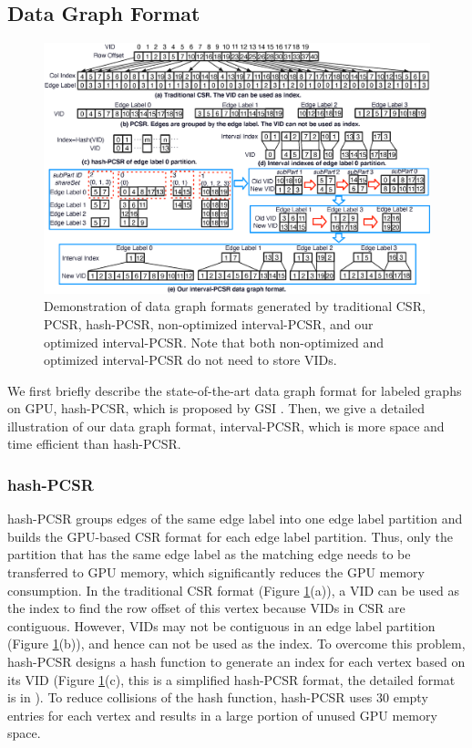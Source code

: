 \subsection{Data Graph Format}
\begin{figure}
\centering
\includegraphics[width=\textwidth]{./figure/graphformat.eps}
\caption{Demonstration of data graph formats generated by traditional CSR, PCSR, hash-PCSR, non-optimized interval-PCSR, and our optimized interval-PCSR. Note that both non-optimized and optimized interval-PCSR do not need to store VIDs.}	
\label{fig:dataformat}
\end{figure}

We first briefly describe the state-of-the-art data graph format for labeled graphs on GPU, hash-PCSR, which is proposed by GSI \cite{zeng2020gsi}. Then, we give a detailed illustration of our data graph format, interval-PCSR, which is more space and time efficient than hash-PCSR.
\subsubsection{hash-PCSR}
hash-PCSR groups edges of the same edge label into one edge label partition and builds the GPU-based CSR format for each edge label partition. Thus, only the partition that has the same edge label as the matching edge needs to be transferred to GPU memory, which significantly reduces the GPU memory consumption. In the traditional CSR format (Figure \ref{fig:dataformat}(a)), a VID can be used as the index to find the row offset of this vertex because VIDs in CSR are contiguous. However, VIDs may not be contiguous in an edge label partition (Figure \ref{fig:dataformat}(b)), and hence can not be used as the index. To overcome this problem, hash-PCSR designs a hash function to generate an index for each vertex based on its VID (Figure \ref{fig:dataformat}(c), this is a simplified hash-PCSR format, the detailed format is in \cite{zeng2020gsi}). To reduce collisions of the hash function, hash-PCSR uses 30 empty entries for each vertex and results in a large portion of unused GPU memory space.

